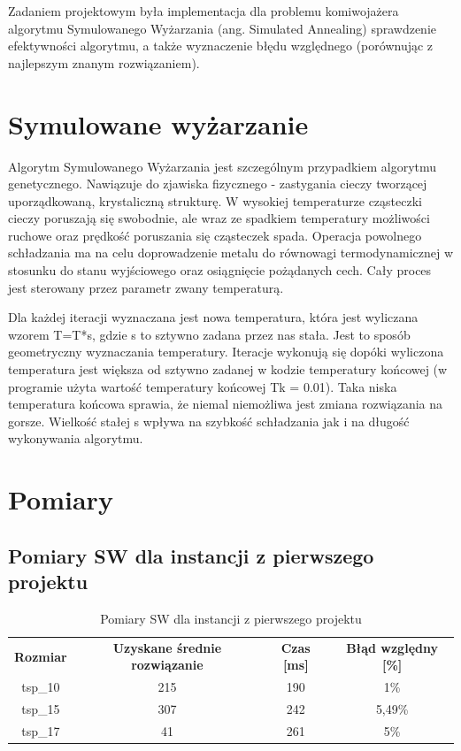\documentclass{article}
\begin{document}
Zadaniem projektowym była implementacja dla problemu komiwojażera algorytmu Symulowanego Wyżarzania (ang. Simulated Annealing) sprawdzenie efektywności algorytmu, a także wyznaczenie błędu względnego (porównując z najlepszym znanym rozwiązaniem). 


\section{Symulowane wyżarzanie}

Algorytm Symulowanego Wyżarzania jest szczególnym przypadkiem algorytmu genetycznego. Nawiązuje do zjawiska fizycznego - zastygania cieczy tworzącej uporządkowaną, krystaliczną strukturę. W wysokiej temperaturze cząsteczki cieczy poruszają się swobodnie, ale wraz ze spadkiem temperatury możliwości ruchowe oraz prędkość poruszania się cząsteczek spada. Operacja powolnego schładzania ma na celu doprowadzenie metalu do równowagi termodynamicznej w stosunku do stanu wyjściowego oraz osiągnięcie pożądanych cech. Cały proces jest sterowany przez parametr zwany temperaturą.

Dla każdej iteracji wyznaczana jest nowa temperatura, która jest wyliczana wzorem T=T*s, gdzie s to sztywno zadana przez nas stała. Jest to sposób geometryczny wyznaczania temperatury.  Iteracje wykonują się dopóki wyliczona temperatura jest większa od sztywno zadanej w kodzie temperatury końcowej (w programie użyta wartość temperatury końcowej Tk = 0.01). Taka niska temperatura końcowa sprawia, że niemal niemożliwa jest zmiana rozwiązania na gorsze. Wielkość stałej s wpływa na szybkość schładzania jak i  na długość wykonywania algorytmu.


\section{Pomiary}

\subsection{Pomiary SW dla instancji z pierwszego projektu}
\begin{table}[h!]
\centering
\begin{tabular}{||c c c c||} 
\textbf{Rozmiar} & \textbf{Uzyskane średnie rozwiązanie} & \textbf{Czas {[}ms{]}} & \textbf{Błąd względny {[}\%{]}} \\
tsp\_10          & 215                                   & 190                    & 1\%                             \\
tsp\_15          & 307                                   & 242                    & 5,49\%                          \\
tsp\_17          & 41                                    & 261                    & 5\%                            
\end{tabular}
\caption{Pomiary SW dla instancji z pierwszego projektu}
\label{table:1}

\end{table}
\newpage
\end{document}
